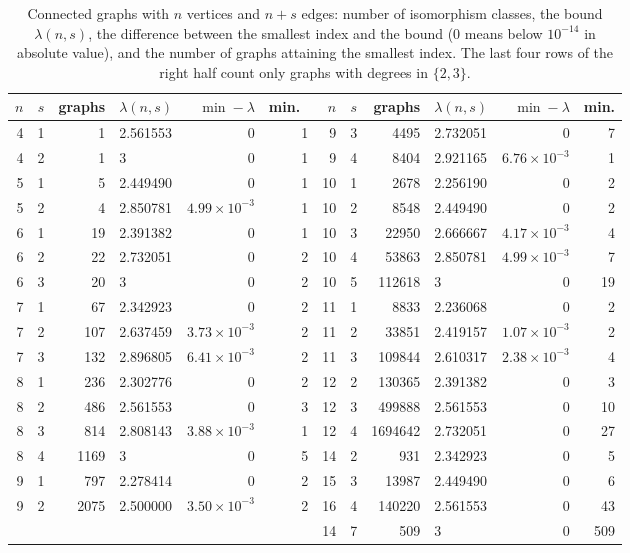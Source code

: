 \documentclass[11pt]{article}
\theoremstyle{definition}
\theoremstyle{remark}
\begin{document}
\begin{table}[ht]
\centering
\small
\setlength{\tabcolsep}{4pt}
\begin{tabular}{rrrlrr@{\qquad}rrrlrr}
\toprule
$n$ & $s$ & graphs & $\lambda(n,s)$ & $\min-\lambda$ & min.\ & $n$ & $s$ & graphs & $\lambda(n,s)$ & $\min-\lambda$ & min.\\
\midrule
4 & 1 & 1 & 2.561553 & 0 & 1 & 9 & 3 & 4495 & 2.732051 & 0 & 7\\
4 & 2 & 1 & 3 & 0 & 1 & 9 & 4 & 8404 & 2.921165 & $6.76\times10^{-3}$ & 1\\
5 & 1 & 5 & 2.449490 & 0 & 1 & 10 & 1 & 2678 & 2.256190 & 0 & 2\\
5 & 2 & 4 & 2.850781 & $4.99\times10^{-3}$ & 1 & 10 & 2 & 8548 & 2.449490 & 0 & 2\\
6 & 1 & 19 & 2.391382 & 0 & 1 & 10 & 3 & 22950 & 2.666667 & $4.17\times10^{-3}$ & 4\\
6 & 2 & 22 & 2.732051 & 0 & 2 & 10 & 4 & 53863 & 2.850781 & $4.99\times10^{-3}$ & 7\\
6 & 3 & 20 & 3 & 0 & 2 & 10 & 5 & 112618 & 3 & 0 & 19\\
7 & 1 & 67 & 2.342923 & 0 & 2 & 11 & 1 & 8833 & 2.236068 & 0 & 2\\
7 & 2 & 107 & 2.637459 & $3.73\times10^{-3}$ & 2 & 11 & 2 & 33851 & 2.419157 & $1.07\times10^{-3}$ & 2\\
7 & 3 & 132 & 2.896805 & $6.41\times10^{-3}$ & 2 & 11 & 3 & 109844 & 2.610317 & $2.38\times10^{-3}$ & 4\\
8 & 1 & 236 & 2.302776 & 0 & 2 & 12 & 2 & 130365 & 2.391382 & 0 & 3\\
8 & 2 & 486 & 2.561553 & 0 & 3 & 12 & 3 & 499888 & 2.561553 & 0 & 10\\
8 & 3 & 814 & 2.808143 & $3.88\times10^{-3}$ & 1 & 12 & 4 & 1694642 & 2.732051 & 0 & 27\\
8 & 4 & 1169 & 3 & 0 & 5 & 14 & 2 & 931 & 2.342923 & 0 & 5\\
9 & 1 & 797 & 2.278414 & 0 & 2 & 15 & 3 & 13987 & 2.449490 & 0 & 6\\
9 & 2 & 2075 & 2.500000 & $3.50\times10^{-3}$ & 2 & 16 & 4 & 140220 & 2.561553 & 0 & 43\\
 &  &  &  &  &  & 14 & 7 & 509 & 3 & 0 & 509\\
\bottomrule
\end{tabular}
\caption{Connected graphs with $n$ vertices and $n+s$ edges: number of isomorphism classes, the bound $\lambda(n,s)$,
the difference between the smallest index and the bound ($0$ means below $10^{-14}$ in absolute value), and the
number of graphs attaining the smallest index. The last four rows of the right half count only graphs with degrees in
$\{2,3\}$.}
\label{tab:data}
\end{table}
\end{document}
